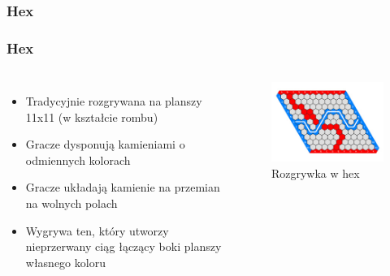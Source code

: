 \documentclass[polish,envcountsect,10pt]{beamer}
\begin{document}
            \subsubsection{Hex}
                \begin{frame}
                    \frametitle{Hex}
                    \begin{columns}
                            \begin{itemize}
                                \item<1-> Tradycyjnie rozgrywana na planszy 11x11 (w kształcie rombu)
                                \item<2-> Gracze dysponują kamieniami o odmiennych kolorach
                                \item<3-> Gracze układają kamienie na przemian na wolnych polach
                                \item<4-> Wygrywa ten, który utworzy nieprzerwany ciąg łączący boki planszy własnego koloru
                            \end{itemize}
                        \begin{figure}[H]
                            \centering
                            \includegraphics[width=\textwidth]{images/hex}
                            \caption{Rozgrywka w hex}
                        \end{figure}
                    \end{columns}                    
                \end{frame}
\end{document}
